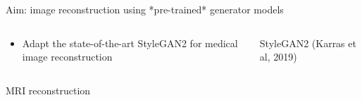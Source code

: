 \documentclass[8pt,xcolor=table,aspectratio=169]{beamer}
\begin{document}
\begin{frame}{Aim: image reconstruction using *pre-trained* generator models}

\begin{columns}
 \begin{column}{0.5\textwidth}
  
  \begin{itemize}
   \item Adapt the state-of-the-art StyleGAN2 for medical image reconstruction

   
  \end{itemize}
  
 \vspace{1em}
 
% 
  \begin{column}{\textwidth}
  \centering
  MRI reconstruction\\
  \mrirecon
  
  \end{column}
  
 \end{column} 
 
 \begin{column}{0.5\textwidth}
 \centering
 StyleGAN2 (Karras et al, 2019)
 \end{column}

\end{columns}



\end{frame}
\end{document}
